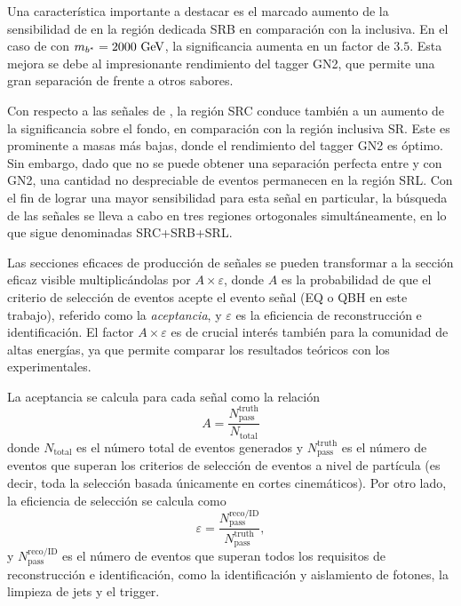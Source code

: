 Una característica importante a destacar es el marcado aumento de la sensibilidad de \bstar en la región dedicada SRB en comparación con la inclusiva. En el caso de \bstar con \(m_{b^*}=2000~\text{GeV}\), la significancia aumenta en un factor de \(3.5\). Esta mejora se debe al impresionante rendimiento del tagger GN2, que permite una gran separación de \bjets frente a otros sabores.

Con respecto a las señales de \cstar, la región SRC conduce también a un aumento de la significancia sobre el fondo, en comparación con la región inclusiva SR. Este es prominente a masas más bajas, donde el rendimiento del tagger GN2 es óptimo.
Sin embargo, dado que no se puede obtener una separación perfecta entre \cquarks y \lquarks con GN2, una cantidad no despreciable de eventos \cstar permanecen en la región \ltagged SRL. Con el fin de lograr una mayor sensibilidad para esta señal en particular, la búsqueda de las señales \cstar se lleva a cabo en tres regiones ortogonales simultáneamente, en lo que sigue denominadas SRC+SRB+SRL.


Las secciones eficaces de producción de señales se pueden transformar a la sección eficaz visible multiplicándolas por \(A \times \varepsilon\), donde \(A\) es la probabilidad de que el criterio de selección de eventos acepte el evento señal (\ac{EQ} o \ac{QBH} en este trabajo), referido como la \textit{aceptancia}, y \(\varepsilon\) es la eficiencia de reconstrucción e identificación. El factor \(A \times \varepsilon\) es de crucial interés también para la comunidad de altas energías, ya que permite comparar los resultados teóricos con los experimentales.

La aceptancia se calcula para cada señal como la relación
\begin{equation}
    A = \frac{N^{\text{truth}}_{\text{pass}}}{N_{\text{total}}}
\end{equation}
donde \(N_{\text{total}}\) es el número total de eventos generados y \(N^{\text{truth}}_{\text{pass}}\) es el número de eventos que superan los criterios de selección de eventos a nivel de partícula (es decir, toda la selección basada únicamente en cortes cinemáticos). Por otro lado, la eficiencia de selección se calcula como
\begin{equation}
    \varepsilon = \frac{N^{\text{reco/ID}}_{\text{pass}}}{N^{\text{truth}}_{\text{pass}}},
\end{equation}
y \(N^{\text{reco/ID}}_{\text{pass}}\) es el número de eventos que superan todos los requisitos de reconstrucción e identificación, como la identificación y aislamiento de fotones, la limpieza de jets y el trigger.


